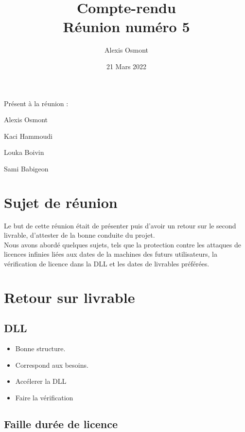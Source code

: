 \documentclass{article}
\title{
    \Huge
    Compte-rendu\\
    Réunion numéro 5\\
}
\date{\huge 21 Mars 2022}
\author{\huge Alexis Osmont\\}
\begin{document}
\maketitle
\vspace{5cm}
    Présent à la réunion :
    \begin{description}
        \item Alexis Osmont
        \item Kaci Hammoudi
        \item Louka Boivin
        \item Sami Babigeon
    \end{description}
\newpage

\section{Sujet de réunion}   

Le but de cette réunion était de présenter puis d'avoir un retour sur le second livrable, d'attester de la bonne conduite du projet.\\

Nous avons abordé quelques sujets, tels que la protection contre les attaques de licences infinies liées aux dates de la machines
des futurs utilisateurs, la vérification de licence dans la DLL et les dates de livrables préférées. 
\vspace{0.5cm}

\section{Retour sur livrable}
\subsection{DLL}

\begin{itemize}
    \item Bonne structure. 
    \item Correspond aux besoins.
    \item Accélerer la DLL 
    \item Faire la vérification
\end{itemize}

\subsection{Faille durée de licence}
\end{document}
